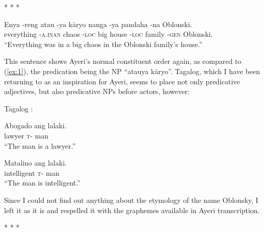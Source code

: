 \documentclass[12pt,paper=letter]{scrartcl}
\newcommand{\q}[1]{\enquote{#1}} %
\newcommand{\divider}{\vspace{0.5\baselineskip} \centerline{* * *} \vspace{0.5\baselineskip}}
\newcommand{\mor}[1]{\textsc{\lowercase{#1}}}
\begin{document}
\divider

\begin{exe} %
    \ex
    \gll Enya -reng atau -ya kāryo nanga -ya pandaha -na Oblonski. \\
    everything \mor{-A.INAN} chaos \mor{-LOC} big house \mor{-LOC} family 
	\mor{-GEN} Oblonski. \\
    \glt \q{Everything was in a big chaos in the Oblonski family's house.}
\end{exe}

This sentence shows Ayeri's normal constituent order again, as compared to 
(\ref{ex:1}), the predication being the NP \q{atauya kāryo}. Tagalog,
which I have been returning to as an inspiration for Ayeri, seems to place 
not only predicative adjectives, but also predicative NPs before actors, however:

\begin{exe}
     Tagalog \autocite[499]{schachter}:
    \begin{xlist}
	\ex
	\gll Abogado ang lalaki. \\
	lawyer \mor{T-} man \\
	\glt \q{The man is a lawyer.}
	
	\ex
	\gll Matalino ang lalaki. \\
	intelligent \mor{T-} man \\
	\glt \q{The man is intelligent.}
    \end{xlist}
\end{exe}

Since I could not find out anything about the etymology of the name Oblonsky,
I left it as it is and respelled it with the graphemes available in Ayeri 
transcription.

\divider
\end{document}
